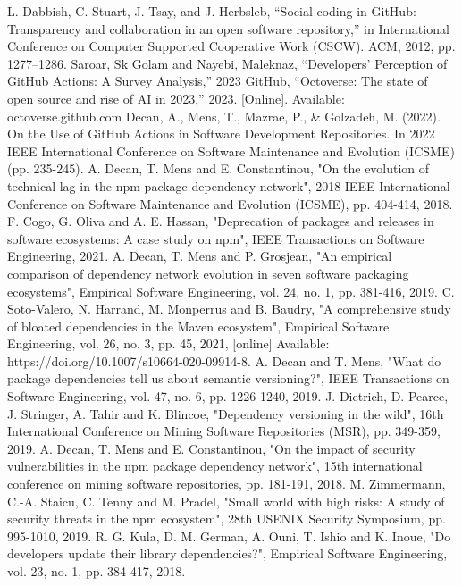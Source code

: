\documentclass[conference]{IEEEtran}
\begin{document}
\begin{thebibliography}{00}
 L. Dabbish, C. Stuart, J. Tsay, and J. Herbsleb, ``Social coding in GitHub: Transparency and collaboration in an open software repository,'' in International Conference on Computer Supported Cooperative Work (CSCW). ACM, 2012, pp. 1277–1286.
 Saroar, Sk Golam and Nayebi, Maleknaz, ``Developers' Perception of GitHub Actions: A Survey Analysis,'' 2023
 GitHub, “Octoverse: The state of open source and rise of AI in 2023,” 2023. [Online]. Available: octoverse.github.com
 Decan, A., Mens, T., Mazrae, P., \& Golzadeh, M. (2022). On the Use of GitHub Actions in Software Development Repositories. In 2022 IEEE International Conference on Software Maintenance and Evolution (ICSME) (pp. 235-245).
 A. Decan, T. Mens and E. Constantinou, "On the evolution of technical lag in the npm package dependency network", 2018 IEEE International Conference on Software Maintenance and Evolution (ICSME), pp. 404-414, 2018.
 F. Cogo, G. Oliva and A. E. Hassan, "Deprecation of packages and releases in software ecosystems: A case study on npm", IEEE Transactions on Software Engineering, 2021.
 A. Decan, T. Mens and P. Grosjean, "An empirical comparison of dependency network evolution in seven software packaging ecosystems", Empirical Software Engineering, vol. 24, no. 1, pp. 381-416, 2019.
  C. Soto-Valero, N. Harrand, M. Monperrus and B. Baudry, "A comprehensive study of bloated dependencies in the Maven ecosystem", Empirical Software Engineering, vol. 26, no. 3, pp. 45, 2021, [online] Available: https://doi.org/10.1007/s10664-020-09914-8.
 A. Decan and T. Mens, "What do package dependencies tell us about semantic versioning?", IEEE Transactions on Software Engineering, vol. 47, no. 6, pp. 1226-1240, 2019.
 J. Dietrich, D. Pearce, J. Stringer, A. Tahir and K. Blincoe, "Dependency versioning in the wild", 16th International Conference on Mining Software Repositories (MSR), pp. 349-359, 2019.
A. Decan, T. Mens and E. Constantinou, "On the impact of security vulnerabilities in the npm package dependency network", 15th international conference on mining software repositories, pp. 181-191, 2018.
 M. Zimmermann, C.-A. Staicu, C. Tenny and M. Pradel, "Small world with high risks: A study of security threats in the npm ecosystem", 28th USENIX Security Symposium, pp. 995-1010, 2019.
 R. G. Kula, D. M. German, A. Ouni, T. Ishio and K. Inoue, "Do developers update their library dependencies?", Empirical Software Engineering, vol. 23, no. 1, pp. 384-417, 2018.

\end{thebibliography}
\end{document}
